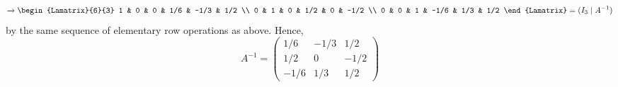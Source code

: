 \documentclass{exam}
\begin{document}
\begin{solution}
\begin{align*}
      \xrightarrow{}
      \begin{Lamatrix}{6}{3}
        1 & 0 & 0 & 1/6 & -1/3 & 1/2 \\
        0 & 1 & 0 & 1/2 & 0 & -1/2 \\
        0 & 0 & 1 & -1/6 & 1/3 & 1/2
      \end{Lamatrix} = (I_3 \mid A^{-1})
    \end{align*}
    by the same sequence of elementary row operations as above. Hence, 
    \[
      \boxed{
        A^{-1} = \begin{pmatrix}
          1/6 & -1/3 & 1/2 \\
          1/2 & 0 & -1/2 \\
          -1/6 & 1/3 & 1/2
        \end{pmatrix}
      }
    \]
  \end{solution}
\end{document}
